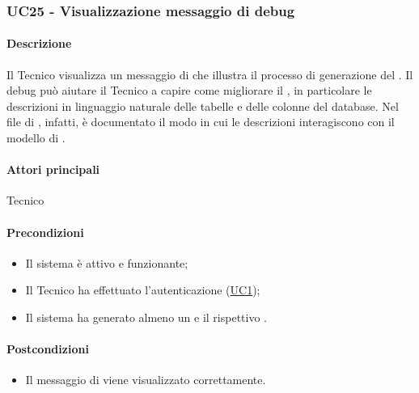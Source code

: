 \subsubsection{UC25 - Visualizzazione messaggio di debug}\label{UC25}
\paragraph*{Descrizione}
Il Tecnico visualizza un messaggio di  che illustra il processo di generazione del . Il debug può aiutare il Tecnico a capire come migliorare il , in particolare le descrizioni in linguaggio naturale delle tabelle e delle colonne del database. Nel file di , infatti, è documentato il modo in cui le descrizioni interagiscono con il modello di .

\paragraph*{Attori principali}
Tecnico

\paragraph*{Precondizioni}
\begin{itemize}
  \item Il sistema è attivo e funzionante;
  \item Il Tecnico ha effettuato l'autenticazione (\hyperref[UC1]{UC1});
  \item Il sistema ha generato almeno un  e il rispettivo .
\end{itemize}

\paragraph*{Postcondizioni}
\begin{itemize}
  \item Il messaggio di  viene visualizzato correttamente.
\end{itemize}

